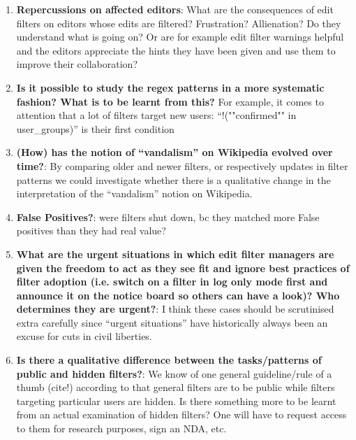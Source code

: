 \begin{enumerate}
    \item \textbf{Repercussions on affected editors}: What are the consequences of edit filters on editors whose edits are filtered? Frustration? Allienation? Do they understand what is going on? Or are for example edit filter warnings helpful and the editors appreciate the hints they have been given and use them to improve their collaboration?
\begin{comment}
Users are urged to use the term "vandalism" carefully, since it tends to offend and drive people away.
("When editors are editing in good faith, mislabeling their edits as vandalism makes them less likely to respond to corrective advice or to engage collaboratively during a disagreement,"~\cite{Wikipedia:Vandalism})
There are also various complaints/comments by users bewildered that their edits appear on an ``abuse log''
\end{comment}
    \item \textbf{Is it possible to study the regex patterns in a more systematic fashion? What is to be learnt from this?} For example, it comes to attention that a lot of filters target new users: ``!(""confirmed"" in user\_groups)'' is their first condition%
    \item \textbf{(How) has the notion of ``vandalism'' on Wikipedia evolved over time?}: By comparing older and newer filters, or respectively updates in filter patterns we could investigate whether there is a qualitative change in the interpretation of the ``vandalism'' notion on Wikipedia.
    \item \textbf{False Positives?}: were filters shut down, bc they matched more False positives than they had real value?
    \item \textbf{What are the urgent situations in which edit filter managers are given the freedom to act as they see fit and ignore best practices of filter adoption (i.e. switch on a filter in log only mode first and announce it on the notice board so others can have a look)? Who determines they are urgent?}: I think these cases should be scrutinised extra carefully since ``urgent situations'' have historically always been an excuse for cuts in civil liberties.
    \item \textbf{Is there a qualitative difference between the tasks/patterns of public and hidden filters?}: We know of one general guideline/rule of a thumb (cite!) according to that general filters are to be public while filters targeting particular users are hidden. Is there something more to be learnt from an actual examination of hidden filters? One will have to request access to them for research purposes, sign an NDA, etc.

\end{enumerate}
